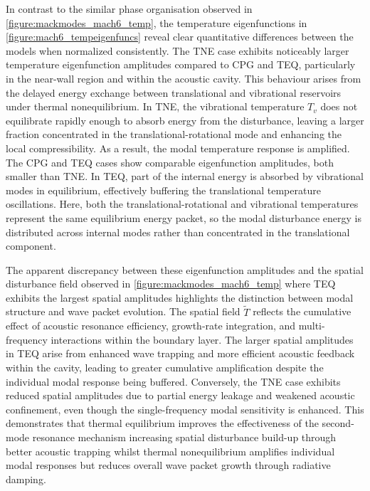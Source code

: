 In contrast to the similar phase organisation observed in \cref{figure:mackmodes_mach6_temp}, the temperature eigenfunctions in \cref{figure:mach6_tempeigenfuncs} reveal clear quantitative differences between the models when normalized consistently. The \gls{TNE} case exhibits noticeably larger temperature eigenfunction amplitudes compared to \gls{CPG} and \gls{TEQ}, particularly in the near-wall region and within the acoustic cavity. This behaviour arises from the delayed energy exchange between translational and vibrational reservoirs under thermal nonequilibrium. In \gls{TNE}, the vibrational temperature $T_v$ does not equilibrate rapidly enough to absorb energy from the disturbance, leaving a larger fraction concentrated in the translational-rotational mode and enhancing the local compressibility. As a result, the modal temperature response is amplified. The \gls{CPG} and \gls{TEQ} cases show comparable eigenfunction amplitudes, both smaller than \gls{TNE}. In \gls{TEQ}, part of the internal energy is absorbed by vibrational modes in equilibrium, effectively buffering the translational temperature oscillations. Here, both the translational-rotational and vibrational temperatures represent the same equilibrium energy packet, so the modal disturbance energy is distributed across internal modes rather than concentrated in the translational component.

The apparent discrepancy between these eigenfunction amplitudes and the spatial disturbance field observed in \cref{figure:mackmodes_mach6_temp} where \gls{TEQ} exhibits the largest spatial amplitudes highlights the distinction between modal structure and wave packet evolution. The spatial field $\tilde{T}$ reflects the cumulative effect of acoustic resonance efficiency, growth-rate integration, and multi-frequency interactions within the boundary layer. The larger spatial amplitudes in \gls{TEQ} arise from enhanced wave trapping and more efficient acoustic feedback within the cavity, leading to greater cumulative amplification despite the individual modal response being buffered. Conversely, the \gls{TNE} case exhibits reduced spatial amplitudes due to partial energy leakage and weakened acoustic confinement, even though the single-frequency modal sensitivity is enhanced. This demonstrates that thermal equilibrium improves the effectiveness of the second-mode resonance mechanism increasing spatial disturbance build-up through better acoustic trapping whilst thermal nonequilibrium amplifies individual modal responses but reduces overall wave packet growth through radiative damping.

